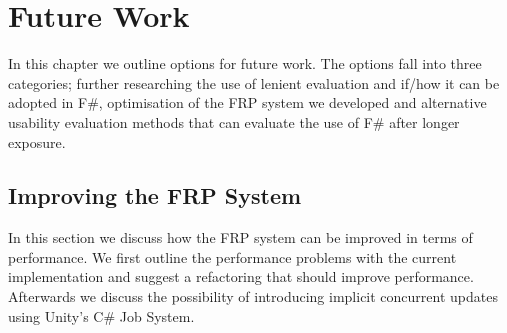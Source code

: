\chapter{Future Work}
In this chapter we outline options for future work. The options fall into three categories; further researching the use of lenient evaluation and if/how it can be adopted in F\#, optimisation of the \gls{FRP} system we developed and alternative usability evaluation methods that can evaluate the use of F\# after longer exposure.


\section{Improving the FRP System}
In this section we discuss how the \gls{FRP} system can be improved in terms of performance. We first outline the performance problems with the current implementation and suggest a refactoring that should improve performance. Afterwards we discuss the possibility of introducing implicit concurrent updates using Unity's C\# Job System.





